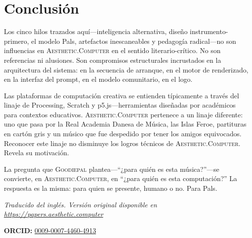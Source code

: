 \documentclass[10pt,letterpaper,twocolumn]{article}
\newcommand{\ac}{\textsc{Aesthetic.Computer}}
\newcommand{\gp}{\textsc{Goodiepal}}
\begin{document}
\section{Conclusión}

Los cinco hilos trazados aquí---inteligencia alternativa, diseño instrumento-primero, el modelo Pals, artefactos inescaneables y pedagogía radical---no son influencias en \ac{} en el sentido literario-crítico. No son referencias ni alusiones. Son compromisos estructurales incrustados en la arquitectura del sistema: en la secuencia de arranque, en el motor de renderizado, en la interfaz del prompt, en el modelo comunitario, en el logo.

Las plataformas de computación creativa se entienden típicamente a través del linaje de Processing, Scratch y p5.js---herramientas diseñadas por académicos para contextos educativos. \ac{} pertenece a un linaje diferente: uno que pasa por la Real Academia Danesa de Música, las Islas Feroe, partituras en cartón gris y un músico que fue despedido por tener los amigos equivocados. Reconocer este linaje no disminuye los logros técnicos de \ac{}. Revela su motivación.

La pregunta que \gp{} plantea---``¿para quién es esta música?''---se convierte, en \ac{}, en ``¿para quién es esta computación?'' La respuesta es la misma: para quien se presente, humano o no. Para Pals.

\vspace{0.5em}
\noindent\textit{Traducido del inglés. Versión original disponible en \url{https://papers.aesthetic.computer}}

\vspace{0.5em}
\noindent\textbf{ORCID:} \href{https://orcid.org/0009-0007-4460-4913}{0009-0007-4460-4913}



\end{document}
